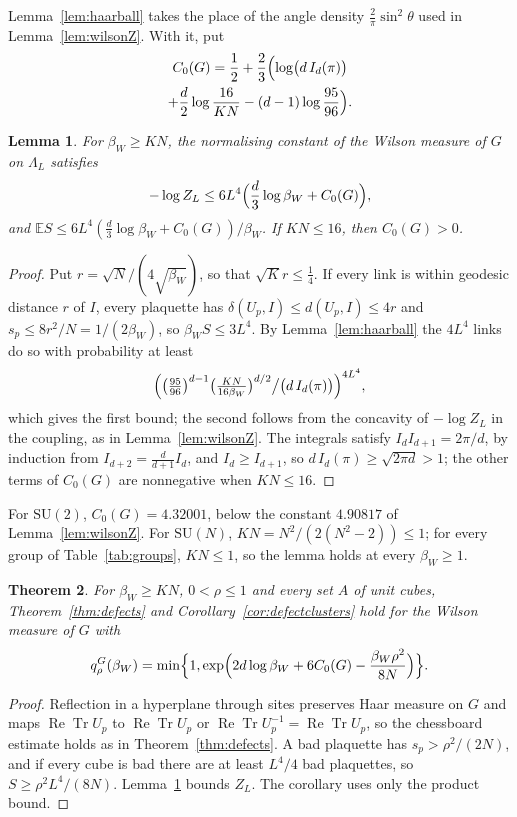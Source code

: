 \documentclass[11pt]{amsart}
\newtheorem{theorem}{Theorem}[section]
\newtheorem{lemma}[theorem]{Lemma}
\theoremstyle{definition}
\theoremstyle{remark}
\numberwithin{equation}{section}
\newcommand{\E}{\mathbb{E}}
\newcommand{\SU}{\mathrm{SU}}
\newcommand{\ReTr}{\operatorname{Re}\operatorname{Tr}}
\begin{document}
Lemma~\ref{lem:haarball} takes the place of the angle density $\frac2\pi
\sin^2\theta$ used in Lemma~\ref{lem:wilsonZ}. With it, put
\begin{multline*}
C_0(G)=\frac12+\frac23\Bigl(\log\bigl(d\,I_d(\pi)\bigr)\\
+\frac d2\log\frac{16}{KN}-(d-1)\log\frac{95}{96}\Bigr).
\end{multline*}

\begin{lemma}\label{lem:wilsonZG}
For $\beta_W\ge KN$, the normalising constant of the Wilson measure of $G$
on $\Lambda_L$ satisfies
\[
-\log Z_L\le6L^4\Bigl(\frac d3\log\beta_W+C_0(G)\Bigr),
\]
and $\E S\le6L^4(\frac d3\log\beta_W+C_0(G))/\beta_W$. If $KN\le16$, then
$C_0(G)>0$.
\end{lemma}

\begin{proof}
Put $r=\sqrt N/(4\sqrt{\beta_W})$, so that $\sqrt Kr\le\frac14$. If every
link is within geodesic distance $r$ of $I$, every plaquette has
$\delta(U_p,I)\le d(U_p,I)\le4r$ and $s_p\le8r^2/N=1/(2\beta_W)$, so
$\beta_WS\le3L^4$. By Lemma~\ref{lem:haarball} the $4L^4$ links do so
with probability at least
\[
\Bigl(\bigl(\tfrac{95}{96}\bigr)^{d-1}\bigl(\tfrac{KN}{16\beta_W}
\bigr)^{d/2}\big/\bigl(d\,I_d(\pi)\bigr)\Bigr)^{4L^4},
\]
which gives the first bound; the second follows from the concavity of
$-\log Z_L$ in the coupling, as in Lemma~\ref{lem:wilsonZ}. The integrals
satisfy $I_dI_{d+1}=2\pi/d$, by induction from $I_{d+2}=\frac d{d+1}I_d$,
and $I_d\ge I_{d+1}$, so $d\,I_d(\pi)\ge\sqrt{2\pi d}>1$; the other terms
of $C_0(G)$ are nonnegative when $KN\le16$.
\end{proof}

For $\SU(2)$, $C_0(G)=4.32001$, below the constant $4.90817$ of
Lemma~\ref{lem:wilsonZ}. For $\SU(N)$, $KN=N^2/(2(N^2-2))\le1$; for every
group of Table~\ref{tab:groups}, $KN\le1$, so the lemma holds at every
$\beta_W\ge1$.

\begin{theorem}\label{thm:defectsG}
For $\beta_W\ge KN$, $0<\rho\le1$ and every set $A$ of unit cubes,
Theorem~\ref{thm:defects} and Corollary~\ref{cor:defectclusters} hold for
the Wilson measure of $G$ with
\[
q^G_\rho(\beta_W)=\min\Bigl\{1,\exp\Bigl(2d\log\beta_W+6C_0(G)-
\frac{\beta_W\rho^2}{8N}\Bigr)\Bigr\}.
\]
\end{theorem}

\begin{proof}
Reflection in a hyperplane through sites preserves Haar measure on $G$ and
maps $\ReTr U_p$ to $\ReTr U_p$ or $\ReTr U_p^{-1}=\ReTr U_p$, so the
chessboard estimate holds as in Theorem~\ref{thm:defects}. A bad
plaquette has $s_p>\rho^2/(2N)$, and if every cube is bad there are at
least $L^4/4$ bad plaquettes, so $S\ge\rho^2L^4/(8N)$. Lemma~\ref{lem:wilsonZG}
bounds $Z_L$. The corollary uses only the product bound.
\end{proof}
\end{document}
